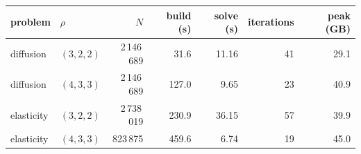 {\small
\begin{tabular}{llrrrrr}
\toprule
problem & $\rho$ & $N$ & build (s) & solve (s) & iterations & peak (GB) \\
\midrule
diffusion & $(3,2,2)$ & 2\,146\,689 & 31.6 & 11.16 & 41 & 29.1 \\
diffusion & $(4,3,3)$ & 2\,146\,689 & 127.0 & 9.65 & 23 & 40.9 \\
elasticity & $(3,2,2)$ & 2\,738\,019 & 230.9 & 36.15 & 57 & 39.9 \\
elasticity & $(4,3,3)$ & 823\,875 & 459.6 & 6.74 & 19 & 45.0 \\
\bottomrule
\end{tabular}
}
